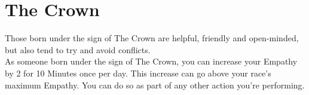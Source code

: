 \section{The Crown}

Those born under the sign of The Crown are helpful, friendly and open-minded, but also tend to try and avoid conflicts.\\
As someone born under the sign of The Crown, you can increase your Empathy by 2 for 10 Minutes once per day. This increase can go above your race's maximum Empathy. You can do so as part of any other action you're performing.\\